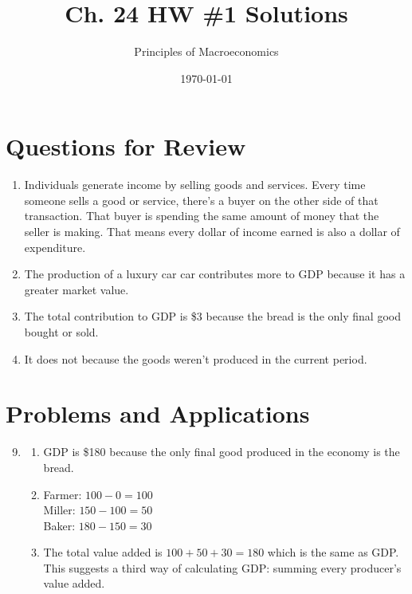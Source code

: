 \documentclass{article}
\title{Ch. 24 HW \#1 Solutions}
\author{Principles of Macroeconomics}
\date{\today}
\begin{document}
\maketitle

\section*{Questions for Review}

\begin{enumerate}

\item Individuals generate income by selling goods and services. Every time someone sells a good or service, there's a buyer on the other side of that transaction. That buyer is spending the same amount of money that the seller is making. That means every dollar of income earned is also a dollar of expenditure. 

\item The production of a luxury car car contributes more to GDP because it has a greater market value.

\item The total contribution to GDP is \$3 because the bread is the only final good bought or sold.

\item It does not because the goods weren't produced in the current period.

\end{enumerate}

\section*{Problems and Applications}

\begin{enumerate}

\setcounter{enumi}{8}

\item

	\begin{enumerate}
	
	\item GDP is \$180 because the only final good produced in the economy is the bread.
	
	\item Farmer: $100 - 0 = 100$ \\
		Miller: $150 - 100 = 50$ \\
		Baker: $180 - 150 = 30$
		
	\item The total value added is $100 + 50 + 30 = 180$ which is the same as GDP. This suggests a third way of calculating GDP: summing every producer's value added. 
	
	\end{enumerate}

\end{enumerate}
\end{document}
